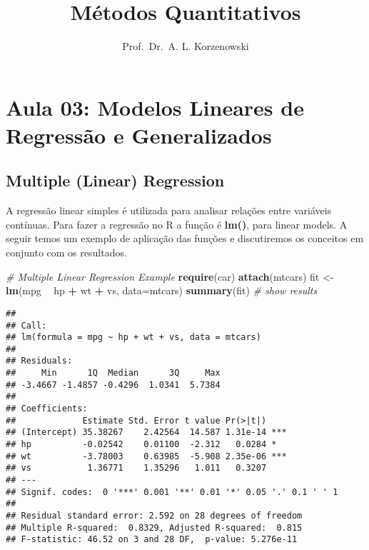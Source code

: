 \documentclass[]{article}
\title{Métodos Quantitativos}
\author{Prof.~Dr.~A. L. Korzenowski}
\date{}
\newenvironment{Shaded}{\begin{snugshade}}{\end{snugshade}}
\newcommand{\CommentTok}[1]{\textcolor[rgb]{0.56,0.35,0.01}{\textit{#1}}}
\newcommand{\DataTypeTok}[1]{\textcolor[rgb]{0.13,0.29,0.53}{#1}}
\newcommand{\KeywordTok}[1]{\textcolor[rgb]{0.13,0.29,0.53}{\textbf{#1}}}
\newcommand{\NormalTok}[1]{#1}
\newcommand{\OperatorTok}[1]{\textcolor[rgb]{0.81,0.36,0.00}{\textbf{#1}}}
\newcommand{\StringTok}[1]{\textcolor[rgb]{0.31,0.60,0.02}{#1}}
\begin{document}
\maketitle

\hypertarget{aula-03-modelos-lineares-de-regressuxe3o-e-generalizados}{%
\section{Aula 03: Modelos Lineares de Regressão e
Generalizados}\label{aula-03-modelos-lineares-de-regressuxe3o-e-generalizados}}

\hypertarget{multiple-linear-regression}{%
\subsection{Multiple (Linear)
Regression}\label{multiple-linear-regression}}

A regressão linear simples é utilizada para analisar relações entre
variáveis contínuas. Para fazer a regressão no R a função é
\textbf{lm()}, para linear models. A seguir temos um exemplo de
aplicação das funções e discutiremos os conceitos em conjunto com os
resultados.

\begin{Shaded}
\begin{Highlighting}[]
\CommentTok{# Multiple Linear Regression Example }
\KeywordTok{require}\NormalTok{(car)}
\KeywordTok{attach}\NormalTok{(mtcars)}
\NormalTok{fit <-}\StringTok{ }\KeywordTok{lm}\NormalTok{(mpg }\OperatorTok{~}\StringTok{ }\NormalTok{hp }\OperatorTok{+}\StringTok{ }\NormalTok{wt }\OperatorTok{+}\StringTok{ }\NormalTok{vs, }\DataTypeTok{data=}\NormalTok{mtcars)}
\KeywordTok{summary}\NormalTok{(fit) }\CommentTok{# show results}
\end{Highlighting}
\end{Shaded}

\begin{verbatim}
## 
## Call:
## lm(formula = mpg ~ hp + wt + vs, data = mtcars)
## 
## Residuals:
##     Min      1Q  Median      3Q     Max 
## -3.4667 -1.4857 -0.4296  1.0341  5.7384 
## 
## Coefficients:
##             Estimate Std. Error t value Pr(>|t|)    
## (Intercept) 35.38267    2.42564  14.587 1.31e-14 ***
## hp          -0.02542    0.01100  -2.312   0.0284 *  
## wt          -3.78003    0.63985  -5.908 2.35e-06 ***
## vs           1.36771    1.35296   1.011   0.3207    
## ---
## Signif. codes:  0 '***' 0.001 '**' 0.01 '*' 0.05 '.' 0.1 ' ' 1
## 
## Residual standard error: 2.592 on 28 degrees of freedom
## Multiple R-squared:  0.8329, Adjusted R-squared:  0.815 
## F-statistic: 46.52 on 3 and 28 DF,  p-value: 5.276e-11
\end{verbatim}
\end{document}

